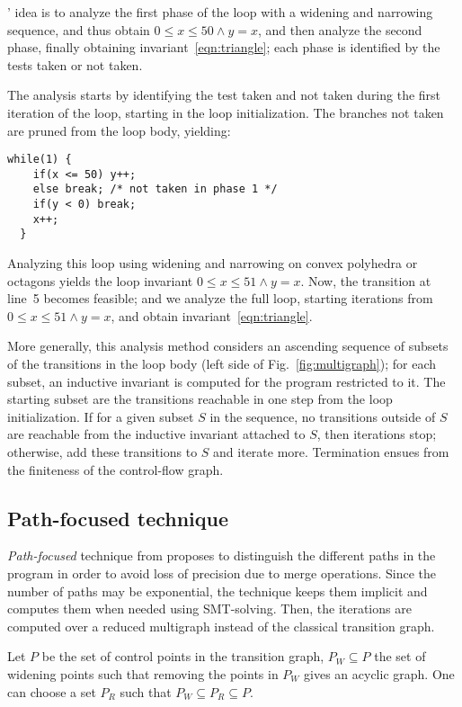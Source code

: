 \documentclass[preprint]{sigplanconf}
\begin{document}
\citeauthor{DBLP:conf/sas/GopanR07}' idea is to analyze the first phase of the loop with a widening and narrowing sequence, and thus obtain $0 \leq x \leq 50 \land y = x$, and then analyze the second phase, finally obtaining invariant~\ref{eqn:triangle}; each phase is identified by the tests taken or not taken.

The analysis starts by identifying the test taken and not taken during the first iteration of the loop, starting in the loop initialization. The branches not taken are pruned from the loop body, yielding:
\begin{lstlisting}[numbers=none]
  while(1) {
    if(x <= 50) y++;
    else break; /* not taken in phase 1 */
    if(y < 0) break;
    x++;
  }
\end{lstlisting}

Analyzing this loop using widening and narrowing on convex polyhedra or octagons yields the loop invariant $0 \leq x \leq 51 \land y = x$. Now, the transition at line~5 becomes feasible; and we analyze the full loop, starting iterations from $0 \leq x \leq 51 \land y = x$, and obtain invariant~\ref{eqn:triangle}.

More generally, this analysis method considers an ascending sequence of subsets of the transitions in the loop body (left side of Fig.~\ref{fig:multigraph});
for each subset, an inductive invariant is computed for the program restricted to it.
The starting subset are the transitions reachable in one step from the loop initialization.
If for a given subset $S$ in the sequence, no transitions outside of $S$ are reachable from the inductive invariant attached to $S$, then iterations stop;
otherwise, add these transitions to $S$ and iterate more.
Termination ensues from the finiteness of the control-flow graph.


\subsection{Path-focused technique}
\label{sec:path_focusing}

\emph{Path-focused} technique from \citet{Monniaux_Gonnord_SAS11} proposes to
distinguish the different paths in the program in order to avoid loss of
precision due to merge operations. Since the number of paths may be exponential,
the technique keeps them implicit and computes them when needed using
SMT-solving. Then, the iterations are computed over a reduced multigraph instead
of the classical transition graph.

Let $P$ be the set of control points in the transition graph, 
$P_W \subseteq P$ the set of widening points
such that removing the points in $P_W$ gives an acyclic graph.
One can choose a set $P_R$ such that $P_W \subseteq P_R \subseteq P$.
\end{document}
